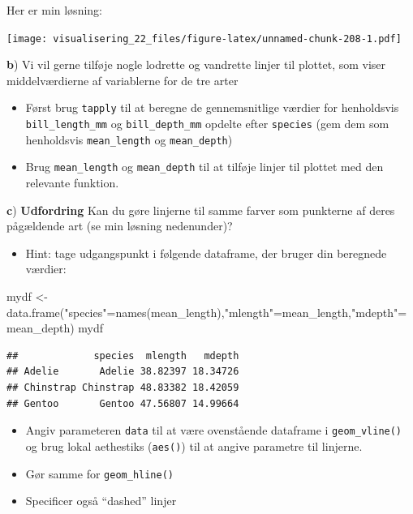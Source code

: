 \documentclass[
]{book}
\newenvironment{Shaded}{\begin{snugshade}}{\end{snugshade}}
\newcommand{\FunctionTok}[1]{\textcolor[rgb]{0.00,0.00,0.00}{#1}}
\newcommand{\NormalTok}[1]{#1}
\newcommand{\OtherTok}[1]{\textcolor[rgb]{0.56,0.35,0.01}{#1}}
\newcommand{\StringTok}[1]{\textcolor[rgb]{0.31,0.60,0.02}{#1}}
\providecommand{\tightlist}{%
  \setlength{\itemsep}{0pt}\setlength{\parskip}{0pt}}
\begin{document}
Her er min løsning:

\texttt{[image: visualisering\_22\_files/figure-latex/unnamed-chunk-208-1.pdf]}

\textbf{b}) Vi vil gerne tilføje nogle lodrette og vandrette linjer til plottet, som viser middelværdierne af variablerne for de tre arter

\begin{itemize}
\tightlist
\item
  Først brug \texttt{tapply} til at beregne de gennemsnitlige værdier for henholdsvis \texttt{bill\_length\_mm} og \texttt{bill\_depth\_mm} opdelte efter \texttt{species} (gem dem som henholdsvis \texttt{mean\_length} og \texttt{mean\_depth})
\item
  Brug \texttt{mean\_length} og \texttt{mean\_depth} til at tilføje linjer til plottet med den relevante funktion.
\end{itemize}

\textbf{c}) \textbf{Udfordring} Kan du gøre linjerne til samme farver som punkterne af deres pågældende art (se min løsning nedenunder)?

\begin{itemize}
\tightlist
\item
  Hint: tage udgangspunkt i følgende dataframe, der bruger din beregnede værdier:
\end{itemize}

\begin{Shaded}
\begin{Highlighting}[]
\NormalTok{mydf }\OtherTok{\textless{}{-}} \FunctionTok{data.frame}\NormalTok{(}\StringTok{"species"}\OtherTok{=}\FunctionTok{names}\NormalTok{(mean\_length),}\StringTok{"mlength"}\OtherTok{=}\NormalTok{mean\_length,}\StringTok{"mdepth"}\OtherTok{=}\NormalTok{mean\_depth)}
\NormalTok{mydf}
\end{Highlighting}
\end{Shaded}

\begin{verbatim}
##             species  mlength   mdepth
## Adelie       Adelie 38.82397 18.34726
## Chinstrap Chinstrap 48.83382 18.42059
## Gentoo       Gentoo 47.56807 14.99664
\end{verbatim}

\begin{itemize}
\tightlist
\item
  Angiv parameteren \texttt{data} til at være ovenstående dataframe i \texttt{geom\_vline()} og brug lokal aethestiks (\texttt{aes()}) til at angive parametre til linjerne.
\item
  Gør samme for \texttt{geom\_hline()}
\item
  Specificer også ``dashed'' linjer
\end{itemize}
\end{document}
